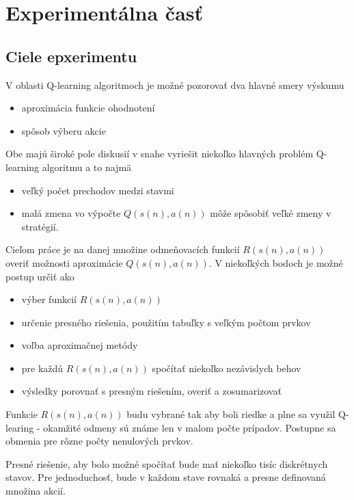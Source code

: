 \chapter{Experimentálna časť}


\section {Ciele epxerimentu}

V oblasti Q-learning algoritmoch je možné pozorovať dva hlavné smery výskumu

\begin{itemize}
\item aproximácia funkcie ohodnotení
\item spôsob výberu akcie
\end{itemize}

Obe majú široké pole diskusií v snahe vyriešit niekoľko hlavných problém Q-learning
algoritmu a to najmä

\begin{itemize}
\item veľký počet prechodov medzi stavmi
\item malá zmena vo výpočte $Q(s(n),a(n))$ môže spôsobiť veľké zmeny v stratégií.
\end{itemize}

Cieľom práce je na danej množine odmeňovacích funkcií $R(s(n), a(n))$ overiť
možnosti aproximácie $Q(s(n), a(n))$.
V niekoľkých bodoch je možné postup určiť ako

\begin{itemize}
\item výber funkcií $R(s(n), a(n))$
\item určenie presného riešenia, použitím tabuľky s veľkým počtom prvkov
\item voľba aproximačnej metódy
\item pre každú $R(s(n), a(n))$ spočítať niekoľko nezávislych behov
\item výsledky porovnať s presným riešením, overiť a zosumarizovať
\end{itemize}

Funkcie $R(s(n), a(n))$ budu vybrané tak aby boli riedke a plne sa využil Q-learing -
okamžité odmeny sú známe len v malom počte prípadov.
Postupne sa obmenia pre rôzne počty nenulových prvkov.

Presné riešenie, aby bolo možné spočítať bude mať niekoľko tisíc diskrétnych stavov.
Pre jednoduchosť, bude v každom stave rovnaká a presne definovaná množina akcií.

